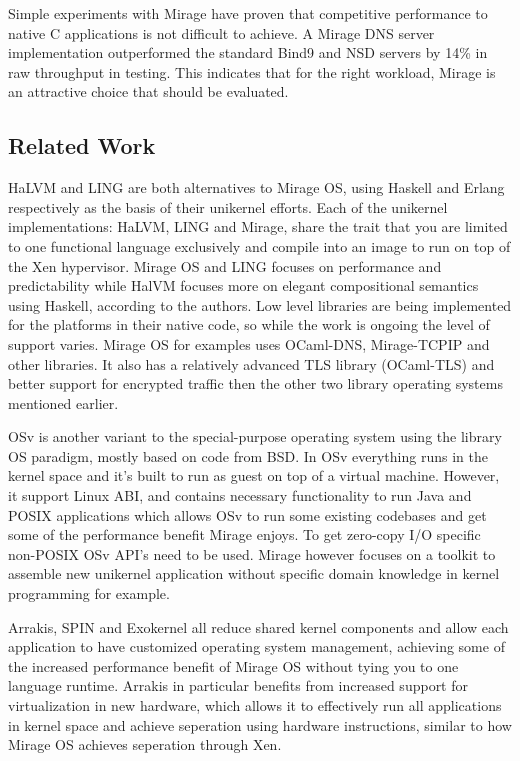 \documentclass[english,10pt,twocolumn]{article}
\begin{document}
Simple experiments with Mirage have proven that competitive performance to native C applications is not difficult to achieve.
A Mirage DNS server implementation outperformed the standard Bind9 and NSD servers by 14\% in raw throughput in testing.
This indicates that for the right workload, Mirage is an attractive choice that should be evaluated.



\subsection{Related Work}

HaLVM\cite{halvm} and LING\cite{ling} are both alternatives to Mirage OS, using Haskell and Erlang respectively as the basis of their unikernel efforts.
Each of the unikernel implementations: HaLVM, LING and Mirage, share the trait that you are limited to one functional language exclusively and compile into an image to run on top of the Xen hypervisor.
Mirage OS and LING focuses on performance and predictability while HalVM focuses more on elegant compositional semantics using Haskell, according to the authors\cite{tripreport}.
Low level libraries are being implemented for the platforms in their native code, so while the work is ongoing the level of support varies.
Mirage OS for examples uses OCaml-DNS, Mirage-TCPIP and other libraries. It also has a relatively advanced TLS library (OCaml-TLS) and better support for encrypted traffic then the other two library operating systems mentioned earlier.

OSv\cite{osv} is another variant to the special-purpose operating system using the library OS paradigm, mostly based on code from BSD.
In OSv everything runs in the kernel space and it's built to run as guest on top of a virtual machine.
However, it support Linux ABI, and contains necessary functionality to run Java and POSIX applications which allows OSv to run some existing codebases and get some of the performance benefit Mirage enjoys.
To get zero-copy I/O specific non-POSIX OSv API's need to be used.
Mirage however focuses on a toolkit to assemble new unikernel application without specific domain knowledge in kernel programming for example.

Arrakis\cite{arrakis}, SPIN\cite{spin} and Exokernel\cite{exokernel} all reduce shared kernel components and allow each application to have customized operating system management, achieving some of the increased performance benefit of Mirage OS without tying you to one language runtime.
Arrakis in particular benefits from increased support for virtualization in new hardware, which allows it to effectively run all applications in kernel space and achieve seperation using hardware instructions, similar to how Mirage OS achieves seperation through Xen.
\end{document}
